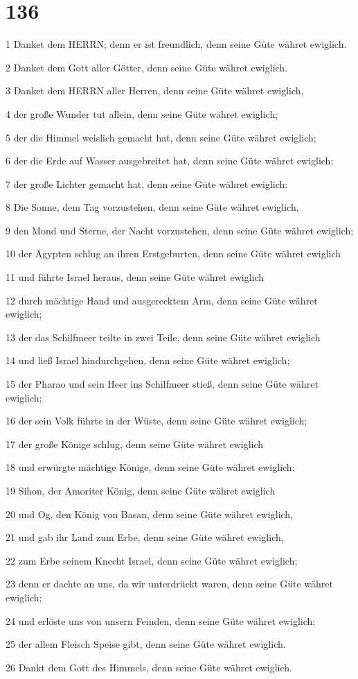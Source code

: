 \chapter{136}

\par 1 Danket dem HERRN; denn er ist freundlich, denn seine Güte währet ewiglich.
\par 2 Danket dem Gott aller Götter, denn seine Güte währet ewiglich.
\par 3 Danket dem HERRN aller Herren, denn seine Güte währet ewiglich,
\par 4 der große Wunder tut allein, denn seine Güte währet ewiglich;
\par 5 der die Himmel weislich gemacht hat, denn seine Güte währet ewiglich;
\par 6 der die Erde auf Wasser ausgebreitet hat, denn seine Güte währet ewiglich;
\par 7 der große Lichter gemacht hat, denn seine Güte währet ewiglich:
\par 8 Die Sonne, dem Tag vorzustehen, denn seine Güte währet ewiglich,
\par 9 den Mond und Sterne, der Nacht vorzustehen, denn seine Güte währet ewiglich;
\par 10 der Ägypten schlug an ihren Erstgeburten, denn seine Güte währet ewiglich
\par 11 und führte Israel heraus, denn seine Güte währet ewiglich
\par 12 durch mächtige Hand und ausgerecktem Arm, denn seine Güte währet ewiglich;
\par 13 der das Schilfmeer teilte in zwei Teile, denn seine Güte währet ewiglich
\par 14 und ließ Israel hindurchgehen, denn seine Güte währet ewiglich;
\par 15 der Pharao und sein Heer ins Schilfmeer stieß, denn seine Güte währet ewiglich;
\par 16 der sein Volk führte in der Wüste, denn seine Güte währet ewiglich;
\par 17 der große Könige schlug, denn seine Güte währet ewiglich
\par 18 und erwürgte mächtige Könige, denn seine Güte währet ewiglich:
\par 19 Sihon, der Amoriter König, denn seine Güte währet ewiglich
\par 20 und Og, den König von Basan, denn seine Güte währet ewiglich,
\par 21 und gab ihr Land zum Erbe, denn seine Güte währet ewiglich,
\par 22 zum Erbe seinem Knecht Israel, denn seine Güte währet ewiglich;
\par 23 denn er dachte an uns, da wir unterdrückt waren, denn seine Güte währet ewiglich;
\par 24 und erlöste uns von unsern Feinden, denn seine Güte währet ewiglich;
\par 25 der allem Fleisch Speise gibt, denn seine Güte währet ewiglich.
\par 26 Dankt dem Gott des Himmels, denn seine Güte währet ewiglich.


